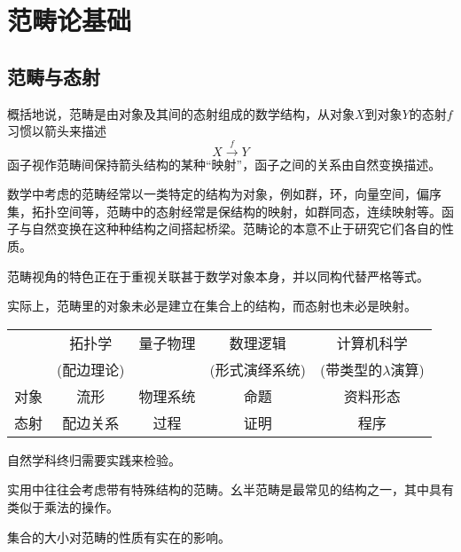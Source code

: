 \chapter{范畴论基础}
\section{范畴与态射}
概括地说，范畴是由对象及其间的态射组成的数学结构，从对象$X$到对象$Y$的态射$f$习惯以箭头来描述
\[
    X \xrightarrow{f} Y
\]
函子视作范畴间保持箭头结构的某种“映射”，函子之间的关系由自然变换描述。

数学中考虑的范畴经常以一类特定的结构为对象，例如群，环，向量空间，偏序集，拓扑空间等，范畴中的态射经常是保结构的映射，如群同态，连续映射等。函子与自然变换在这种种结构之间搭起桥梁。范畴论的本意不止于研究它们各自的性质。

    范畴视角的特色正在于重视关联甚于数学对象本身，并以同构代替严格等式。

    实际上，范畴里的对象未必是建立在集合上的结构，而态射也未必是映射。

    \begin{center}
        \begin{tabular}{|c|c|c|c|c|}\hline
                & 拓扑学 & 量子物理 & 数理逻辑 & 计算机科学   \\
                & (配边理论) & & (形式演绎系统) & (带类型的$\lambda$演算)  \\ \hline
            对象 & 流形 & 物理系统 & 命题 & 资料形态 \\ \hline
            态射 & 配边关系 & 过程 & 证明 & 程序 \\  \hline
        \end{tabular}
    \end{center}
    自然学科终归需要实践来检验。

    实用中往往会考虑带有特殊结构的范畴。幺半范畴是最常见的结构之一，其中具有类似于乘法的操作。

    集合的大小对范畴的性质有实在的影响。

